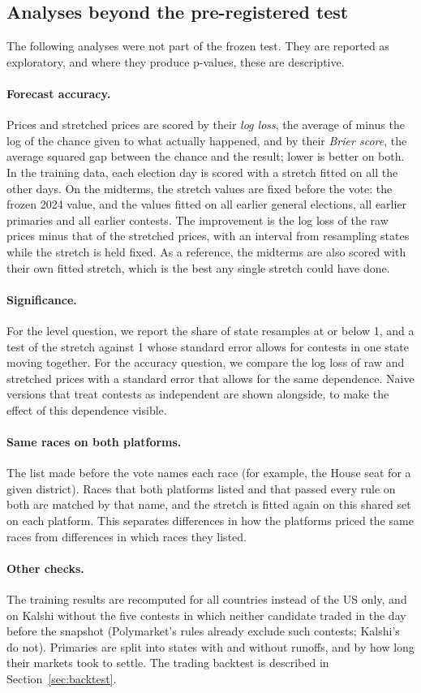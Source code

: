 \subsection{Analyses beyond the pre-registered test}

The following analyses were not part of the frozen test. They are reported as exploratory, and where they produce
p-values, these are descriptive.

\paragraph{Forecast accuracy.} Prices and stretched prices are scored by their \emph{log loss}, the average of minus
the log of the chance given to what actually happened, and by their \emph{Brier score}, the average squared gap
between the chance and the result; lower is better on both. In the training data, each election day is scored with a
stretch fitted on all the other days. On the midterms, the stretch values are fixed before the vote: the frozen 2024
value, and the values fitted on all earlier general elections, all earlier primaries and all earlier contests. The
improvement is the log loss of the raw prices minus that of the stretched prices, with an interval from resampling
states while the stretch is held fixed. As a reference, the midterms are also scored with their own fitted stretch,
which is the best any single stretch could have done.

\paragraph{Significance.} For the level question, we report the share of state resamples at or below 1, and a test of
the stretch against 1 whose standard error allows for contests in one state moving together. For the accuracy
question, we compare the log loss of raw and stretched prices with a standard error that allows for the same
dependence. Naive versions that treat contests as independent are shown alongside, to make the effect of this
dependence visible.

\paragraph{Same races on both platforms.} The list made before the vote names each race (for example, the House seat
for a given district). Races that both platforms listed and that passed every rule on both are matched by that name,
and the stretch is fitted again on this shared set on each platform. This separates differences in how the platforms
priced the same races from differences in which races they listed.

\paragraph{Other checks.} The training results are recomputed for all countries instead of the US only, and on Kalshi
without the five contests in which neither candidate traded in the day before the snapshot (Polymarket's rules
already exclude such contests; Kalshi's do not). Primaries are split into states with and without runoffs, and by
how long their markets took to settle. The trading backtest is described in Section~\ref{sec:backtest}.
